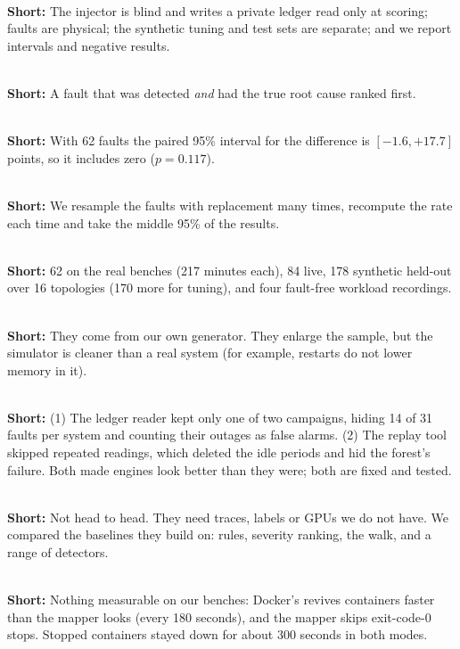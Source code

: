 \\
\textbf{Short:} The injector is blind and writes a private ledger read only at scoring; faults are physical; the synthetic tuning and test sets are separate; and we report intervals and negative results.

\\
\textbf{Short:} A fault that was detected \emph{and} had the true root cause ranked first.

\\
\textbf{Short:} With 62 faults the paired 95\% interval for the difference is $[-1.6,+17.7]$ points, so it includes zero ($p=0.117$).

\\
\textbf{Short:} We resample the faults with replacement many times, recompute the rate each time and take the middle 95\% of the results.

\\
\textbf{Short:} 62 on the real benches (217 minutes each), 84 live, 178 synthetic held-out over 16 topologies (170 more for tuning), and four fault-free workload recordings.

\\
\textbf{Short:} They come from our own generator. They enlarge the sample, but the simulator is cleaner than a real system (for example, restarts do not lower memory in it).

\\
\textbf{Short:} (1) The ledger reader kept only one of two campaigns, hiding 14 of 31 faults per system and counting their outages as false alarms. (2) The replay tool skipped repeated readings, which deleted the idle periods and hid the forest's failure. Both made engines look better than they were; both are fixed and tested.

\\
\textbf{Short:} Not head to head. They need traces, labels or GPUs we do not have. We compared the baselines they build on: rules, severity ranking, the walk, and a range of detectors.

\\
\textbf{Short:} Nothing measurable on our benches: Docker's  revives containers faster than the mapper looks (every 180 seconds), and the mapper skips exit-code-0 stops. Stopped containers stayed down for about 300 seconds in both modes.

